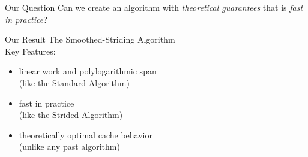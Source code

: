 \documentclass[xcolor=x11names, svgnames, rgb]{beamer}
\begin{document}
\begin{frame}[t]{Our Question}
	\vspace{1cm}
	{\Large Can we create an algorithm with \emph{theoretical guarantees} that is \emph{fast in practice}?}
\end{frame}

\begin{frame}[t]{Our Result}
	\vspace{0.15cm}
	{\Large The Smoothed-Striding Algorithm\\}
	\vspace{0.5cm}
	Key Features:
	\begin{itemize}
		\item linear work and polylogarithmic span \\
			{\color{blue} (like the Standard Algorithm)\\}
		\vspace{0.15cm}
		\item fast in practice \\
			{\color{blue} (like the Strided Algorithm)\\}
	\vspace{0.15cm}
		\item theoretically optimal cache behavior \\
			{\color{blue} (unlike any past algorithm)}
	\end{itemize}
\end{frame}
\end{document}
